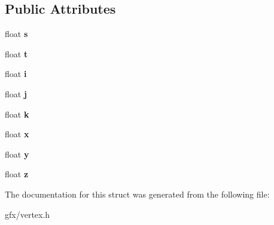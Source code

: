 \subsection*{Public Attributes}
\begin{DoxyCompactItemize}
\item 
float {\bfseries s}\hypertarget{structglVertex_a9b100d023666172eed3c4887b3679ad2}{}\label{structglVertex_a9b100d023666172eed3c4887b3679ad2}

\item 
float {\bfseries t}\hypertarget{structglVertex_ae99a0479a4cb14129f2a620ed023ceb4}{}\label{structglVertex_ae99a0479a4cb14129f2a620ed023ceb4}

\item 
float {\bfseries i}\hypertarget{structglVertex_aa63469e0e14d834bf37e3a6daa328f70}{}\label{structglVertex_aa63469e0e14d834bf37e3a6daa328f70}

\item 
float {\bfseries j}\hypertarget{structglVertex_acb727950cbdaf7552f7952608365837f}{}\label{structglVertex_acb727950cbdaf7552f7952608365837f}

\item 
float {\bfseries k}\hypertarget{structglVertex_aa36bfd3412681e07215ea2f0de589d5e}{}\label{structglVertex_aa36bfd3412681e07215ea2f0de589d5e}

\item 
float {\bfseries x}\hypertarget{structglVertex_ac639847adf71043347d8765cec700622}{}\label{structglVertex_ac639847adf71043347d8765cec700622}

\item 
float {\bfseries y}\hypertarget{structglVertex_a52128c5d33b53bb2760452dba81da84d}{}\label{structglVertex_a52128c5d33b53bb2760452dba81da84d}

\item 
float {\bfseries z}\hypertarget{structglVertex_a95eea3e9faa0773b587cba4a29a427e8}{}\label{structglVertex_a95eea3e9faa0773b587cba4a29a427e8}

\end{DoxyCompactItemize}


The documentation for this struct was generated from the following file\+:\begin{DoxyCompactItemize}
\item 
gfx/vertex.\+h\end{DoxyCompactItemize}
